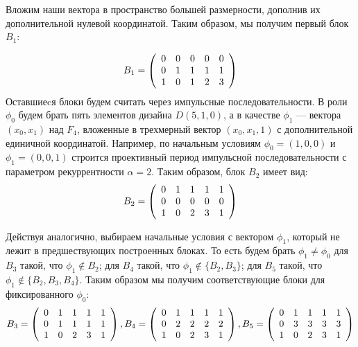 \documentclass[12pt]{article}
\begin{document}
    Вложим наши вектора в пространство большей размерности, дополнив их дополнительной нулевой координатой. Таким образом, мы получим первый блок $B_1$:

    $$B_1 =
    \left( {\begin{array}{*{20}c}
                0 & 0 & 0 & 0 & 0  \\
                0 & 1 & 1 & 1 & 1\\
                1 & 0 & 1 & 2 & 3
    \end{array} } \right)
    $$
    Оставшиеcя блоки будем считать через импульсные последовательности. В роли $\phi_0$ будем брать пять элементов дизайна $D(5, 1, 0)$, а в качестве $\phi_1$ — вектора $(x_0, x_1)$ над $F_4$, вложенные в трехмерный вектор $(x_0, x_1, 1)$ с дополнительной единичной координатой. Например, по начальным условиям $\phi_0 = (1, 0, 0)$ и $\phi_1 = (0, 0, 1)$ строится проективный период импульсной последовательности с параметром рекуррентности $\alpha = 2$. Таким образом, блок $B_2$ имеет вид:
    $$B_2 =
    \left( {\begin{array}{*{20}c}
                0 & 1 & 1 & 1 & 1\\
                0 & 0 & 0 & 0 & 0\\
                1 & 0 & 2 & 3 & 1
    \end{array} } \right)
    $$

    Действуя аналогично, выбираем начальные условия с вектором $\phi_1$, который не лежит в предшествующих построенных блоках. То есть будем брать $\phi_1 \neq \phi_0$ для $B_3$ такой, что $\phi_1 \notin B_2$; для $B_4$ такой, что $\phi_1 \notin \{B_2,B_3\}$; для $B_5$ такой, что $\phi_1 \notin \{B_2,B_3,B_4\}$. Таким образом мы получим соответствующие блоки для фиксированного $\phi_0$:
    $$B_3 =
    \left( {\begin{array}{*{20}c}
                0 & 1 & 1 & 1 & 1\\
                0 & 1 & 1 & 1 & 1\\
                1 & 0 & 2 & 3 & 1
    \end{array} } \right),
    B_4 =
    \left( {\begin{array}{*{20}c}
                0 & 1 & 1 & 1 & 1\\
                0 & 2 & 2 & 2 & 2\\
                1 & 0 & 2 & 3 & 1
    \end{array} } \right),
    B_5 =
    \left( {\begin{array}{*{20}c}
                0 & 1 & 1 & 1 & 1\\
                0 & 3 & 3 & 3 & 3\\
                1 & 0 & 2 & 3 & 1
    \end{array} } \right)
    $$
\end{document}
